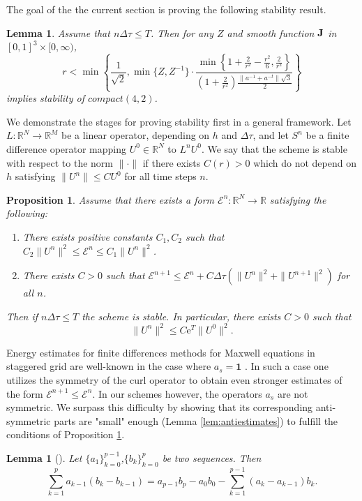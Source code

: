 \documentclass[12pt,reqno]{amsart}
\newcommand{\R}{\mathbb{R}}
\newcommand{\J}{{\bf J}}
\newtheorem{lem}[theorem]{Lemma}
\newtheorem{lemma}[theorem]{Lemma}
\newtheorem{proposition}[theorem]{Proposition}
\theoremstyle{definition}
\numberwithin{equation}{section}
\begin{document}
 	The goal of the the current section is proving the following stability result.
 \begin{lemma}\label{lem:coer}
 	Assume that $n\Delta \tau\leq T$. Then
 	for any $Z$ and smooth function $\J$ in $[0,1]^3\times [0,\infty)$, 
 	$$
 	r<\min \left \{  
 	\frac{1}{\sqrt{2}},\min\{Z,Z^{-1}\}\cdot
 	 \frac
 	 { 	\min\left \{    
 	 	1+\frac{2}{r^2}-\frac{r^2}{6},\frac{2}{r^2}
 	 	\right\}}
 	 {\left(1+\frac{2}{r^2}\right)\frac{\|a^{-1}+a^{-t}\|\sqrt{3}}{2}}
 	 \right \}
 	$$
 	implies stability of $compact(4,2)$.
 \end{lemma}
 We demonstrate the stages for proving stability first in  a general framework.
 Let $L:\R^N\to \R^M$ be a linear operator, depending on $h$ and $\Delta \tau$, and let $S^n$ be a finite difference operator mapping $U^0\in \R^N$ to $L^nU^0$.
We say that the scheme is stable with respect to the norm $\|\cdot \|$ if  there exists $C(r)>0$ which do not depend on $h$ satisfying 
 $\|U^n\|\leq CU^0$ for all time steps $n$.
 \begin{proposition}\cite[section 5]{GKO}\label{prop:p1}
 	Assume that there exists a form $\mathcal{E}^n:\R^N\to \R$ satisfying the following:
 	\begin{enumerate}
 		\item There exists positive constants $C_1,C_2$ such that $C_2 \|U^n\|^2\leq \mathcal{E}^n\leq C_1 \|U^n\|^2$.
 		\item There exists $C>0$ such that $\mathcal{E}^{n+1}\leq \mathcal{E}^n+C\Delta \tau(\|U^n\|^2+\|U^{n+1}\|^2)$ for all $n$.
 	\end{enumerate}
 Then  if $n\Delta \tau\leq T$ the scheme is stable. In particular,  there exists $C>0$ such that
 $$
 \|U^n\|^2\leq C\mathrm{e}^T\|U^0\|^2.
 $$
 \end{proposition}
Energy estimates for finite differences methods for Maxwell  equations in staggered grid are well-known in the case where $a_s=\mathbf{1}$ \cite{sakka}.
 In such a case one utilizes the symmetry of the curl operator to obtain even stronger estimates of the form  $\mathcal{E}^{n+1}\leq \mathcal{E}^n$. 
In our schemes however, the operators $a_s$ are not symmetric. We surpass this difficulty by showing that its corresponding  anti-symmetric parts are "small" enough (Lemma \ref{lem:antiestimates}) to fulfill the conditions of Proposition \ref{prop:p1}.
 

\begin{lem}[\cite{Morton}]
Let $\{a_1\}_{k=0}^{p-1}$,$\{b_k\}_{k=0}^{p}$ be two sequences. Then
$$
\sum_{k=1}^{p}a_{k-1}(b_k-b_{k-1})=a_{p-1}b_p-a_{0}b_0-\sum_{k=1}^{p-1}(a_{k}-a_{k-1})b_k.
$$
\end{lem}
\end{document}
